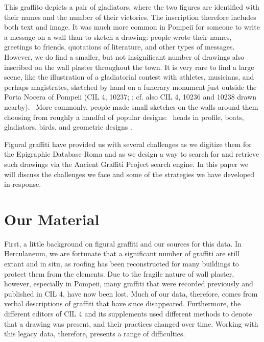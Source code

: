 \documentclass[amsthm,ebook]{saparticle}
\begin{document}
This graffito depicts a pair of gladiators, where the two figures are identified with their names and the number of
their victories. The inscription therefore includes both text and image. It was much more common in Pompeii for someone
to write a message on a wall than to sketch a drawing: people wrote their names, greetings to friends, quotations of
literature, and other types of messages. However, we do find a smaller, but not insignificant number of drawings also
inscribed on the wall plaster throughout the town. It is very rare to find a large scene, like the illustration of a
gladiatorial contest with athletes, musicians, and perhaps magistrates, sketched by hand on a funerary monument just
outside the Porta Nocera of Pompeii (CIL 4, 10237; \citet[D31]{cooley_pompeii_2013}; cf. also CIL 4, 10236 and 10238 drawn
nearby). \ More commonly, people made small sketches on the walls around them choosing from roughly a handful of
popular designs: \ heads in profile, boats, gladiators, birds, and geometric designs \citep{langner_antike_2001}.




Figural graffiti have provided us with several challenges as we digitize them for the Epigraphic Database Roma and as we
design a way to search for and retrieve such drawings via the Ancient Graffiti Project search engine. In this paper we
will discuss the challenges we face and some of the strategies we have developed in response. 




\section{Our Material}
 

\noindent First, a little background on figural graffiti and our sources for this data. In Herculaneum, we are fortunate that a
significant number of graffiti are still extant and in situ, as roofing has been reconstructed for many buildings to
protect them from the elements. Due to the fragile nature of wall plaster, however, especially in Pompeii, many
graffiti that were recorded previously and published in CIL 4, have now been lost. Much of our data, therefore, comes
from verbal descriptions of graffiti that have since disappeared. Furthermore, the different editors of CIL 4 and its
supplements used different methods to denote that a drawing was present, and their practices changed over time. Working
with this legacy data, therefore, presents a range of difficulties. 
\end{document}
